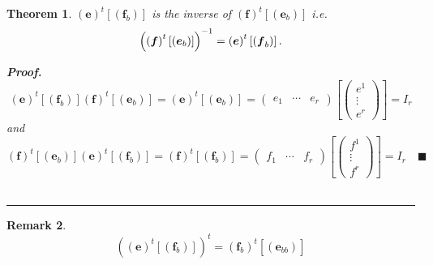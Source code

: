\documentclass[aps,preprint]{revtex4}
\newtheorem{theorem}{Theorem}
\newtheorem{remark}[theorem]{Remark}
\newenvironment{proof}[1][Proof]{\noindent\textbf{#1.} }{\ \rule{0.5em}{0.5em}}
\begin{document}
\begin{theorem}
$\left( \boldsymbol{e}\right) ^{t}\left[ \left( \boldsymbol{f}_{b}\right) %
\right] $ is the inverse of $\left( \boldsymbol{f}\right) ^{t}\left[ \left( 
\boldsymbol{e}_{b}\right) \right] $ i.e. 
\begin{equation}
\left( \overset{}{\left( \boldsymbol{f}\right) ^{t}\left[ \left( \boldsymbol{%
e}_{b}\right) \right] }\right) ^{-1}=\left( \boldsymbol{e}\right) ^{t}\left[
\left( \boldsymbol{f}_{b}\right) \right] .
\end{equation}

\begin{proof}
\begin{equation}
\left( \boldsymbol{e}\right) ^{t}\left[ \left( \boldsymbol{f}_{b}\right) %
\right] \left( \boldsymbol{f}\right) ^{t}\left[ \left( \boldsymbol{e}%
_{b}\right) \right] =\left( \boldsymbol{e}\right) ^{t}\left[ \left( 
\boldsymbol{e}_{b}\right) \right] =\left( 
\begin{array}{ccc}
e_{1} & \cdots & e_{r}%
\end{array}%
\right) \left[ \left( 
\begin{array}{c}
e^{1} \\ 
\vdots \\ 
e^{r}%
\end{array}%
\right) \right] =I_{r}
\end{equation}%
and 
\begin{equation}
\left( \boldsymbol{f}\right) ^{t}\left[ \left( \boldsymbol{e}_{b}\right) %
\right] \left( \boldsymbol{e}\right) ^{t}\left[ \left( \boldsymbol{f}%
_{b}\right) \right] =\left( \boldsymbol{f}\right) ^{t}\left[ \left( 
\boldsymbol{f}_{b}\right) \right] =\left( 
\begin{array}{ccc}
f_{1} & \cdots & f_{r}%
\end{array}%
\right) \left[ \left( 
\begin{array}{c}
f^{1} \\ 
\vdots \\ 
f^{r}%
\end{array}%
\right) \right] =I_{r}\quad \blacksquare
\end{equation}
\end{proof}
\end{theorem}

\begin{remark}
\begin{equation}
\left( \left( \boldsymbol{e}\right) ^{t}\left[ \left( \boldsymbol{f}%
_{b}\right) \right] \right) ^{t}=\left( \boldsymbol{f}_{b}\right) ^{t}\left[ 
\overset{}{\left( \boldsymbol{e}_{bb}\right) }\right]
\end{equation}
\end{remark}
\end{document}
